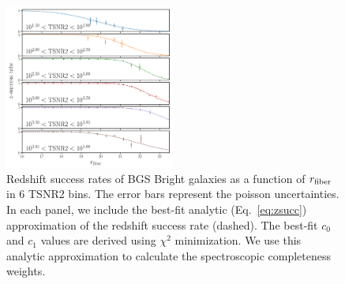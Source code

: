 \begin{figure}
\begin{center}
    \includegraphics[width=0.5\textwidth]{figs/bgs_bright_rfib_tsnr2_zsuccess.pdf}
    \caption{
        Redshift success rates of BGS Bright galaxies  as a function of 
        $r_{\rm fiber}$ in 6 TSNR2 bins. 
        The error bars represent the poisson uncertainties.
        In each panel, we include the best-fit analytic (Eq.~\ref{eq:zsucc})
        approximation of the redshift success rate (dashed). 
        The best-fit $c_0$ and $c_1$ values are derived using $\chi^2$
        minimization. 
        We use this analytic approximation to calculate the spectroscopic
        completeness weights.
    }\label{fig:zfail1}
\end{center}
\end{figure}
